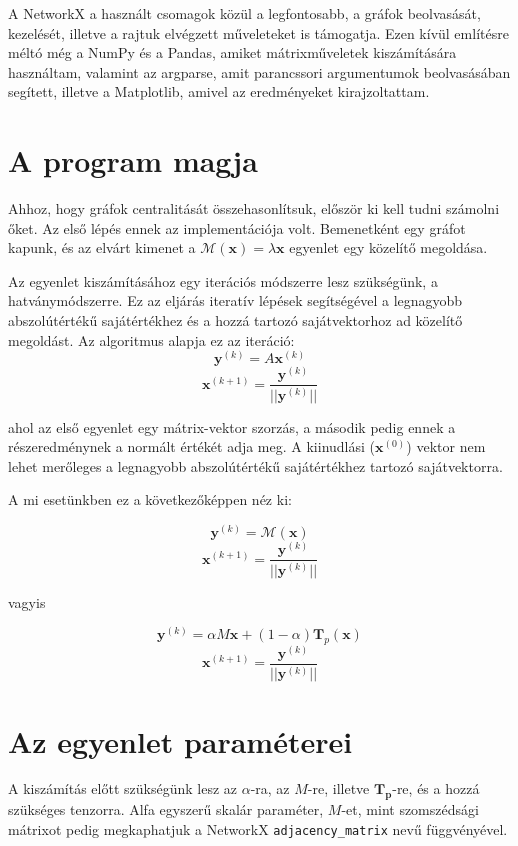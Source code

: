 \documentclass[12pt,numbers=noenddot]{report}
\begin{document}
A NetworkX \cite{networkx} a használt csomagok közül a legfontosabb, a gráfok beolvasását,
kezelését, illetve a rajtuk elvégzett műveleteket is támogatja. Ezen kívül
említésre méltó még a NumPy és a Pandas, amiket mátrixműveletek kiszámítására
használtam, valamint az argparse, amit parancssori argumentumok beolvasásában 
segített, illetve a Matplotlib, amivel az eredményeket kirajzoltattam.

\section{A program magja}

Ahhoz, hogy gráfok centralitását összehasonlítsuk, először ki kell tudni számolni őket.
Az első lépés ennek az implementációja volt. Bemenetként egy gráfot kapunk, és az elvárt kimenet a 
$\mathcal{M}(\boldsymbol{x}) = \lambda \boldsymbol{x}$
egyenlet egy közelítő megoldása. 

Az egyenlet kiszámításához egy iterációs módszerre lesz szükségünk, a hatványmódszerre.
Ez az eljárás iteratív lépések segítségével a legnagyobb abszolútértékű sajátértékhez
és a hozzá tartozó sajátvektorhoz ad közelítő megoldást. \cite{power-method-def}
Az algoritmus alapja ez az iteráció:
$$\boldsymbol{y}^{(k)} = A \boldsymbol{x}^{(k)}$$
$$\boldsymbol{x}^{(k+1)} = \frac{\boldsymbol{y}^{(k)}}{||\boldsymbol{y}^{(k)}||}$$

ahol az első egyenlet egy mátrix-vektor szorzás, a második pedig ennek a részeredménynek a normált értékét adja meg.
A kiinudlási ($\boldsymbol{x}^{(0)}$) vektor nem lehet merőleges a legnagyobb abszolútértékű sajátértékhez tartozó sajátvektorra.

\pagebreak

A mi esetünkben ez a következőképpen néz ki:

$$\boldsymbol{y}^{(k)} = \mathcal{M}(\boldsymbol{x})$$
$$\boldsymbol{x}^{(k+1)} = \frac{\boldsymbol{y}^{(k)}}{||\boldsymbol{y}^{(k)}||}$$

vagyis

$$\boldsymbol{y}^{(k)} = \alpha M \boldsymbol{x} + (1-\alpha) \boldsymbol{T}_p(\boldsymbol{x})$$
$$\boldsymbol{x}^{(k+1)} = \frac{\boldsymbol{y}^{(k)}}{||\boldsymbol{y}^{(k)}||}$$


\section{Az egyenlet paraméterei}

A kiszámítás előtt szükségünk lesz az $\alpha$-ra, az $M$-re, illetve $\boldsymbol{T_p}$-re, és a hozzá szükséges tenzorra.
Alfa egyszerű skalár paraméter, $M$-et, mint szomszédsági mátrixot pedig megkaphatjuk 
a NetworkX \texttt{adjacency\_matrix} nevű függvényével.
\end{document}
